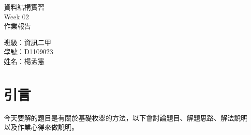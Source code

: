 \documentclass[12pt, a4paper]{article}
\begin{document}
  \begin{center}
    {\Huge 資料結構實習} \\[2.5cm]
    {\Huge Week 02} \\[1.5cm]
    {\Huge 作業報告} \\ [4.5cm]
    \hspace{.6in}
    \begin{minipage}[t]{.4\linewidth}
      {\Large 班級：資訊二甲}\\[0.5cm]
      {\Large 學號：D1109023}\\[0.5cm]
      {\Large 姓名：楊孟憲}
    \end{minipage}    
  \end{center}

  \newpage

  \begin{samepage}
    \fontsize{18pt}{20pt} \selectfont  
    \tableofcontents
    \normalfont
  \end{samepage}
  
  \newpage


  \section{\fontsize{20pt}{22pt}\selectfont 引言}
  \begin{samepage}
    \fontsize{16pt}{18pt} \selectfont
    今天要解的題目是有關於基礎枚舉的方法，以下會討論題目、解題思路、解法說明以及作業心得來做說明。
  \end{samepage}

\end{document}
